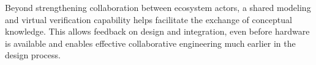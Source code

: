 Beyond strengthening collaboration between ecosystem actors, a shared modeling and virtual verification capability helps 
facilitate the exchange of conceptual knowledge. 
This allows feedback on design and integration, even before hardware is available and enables effective collaborative engineering much earlier in the design process.



